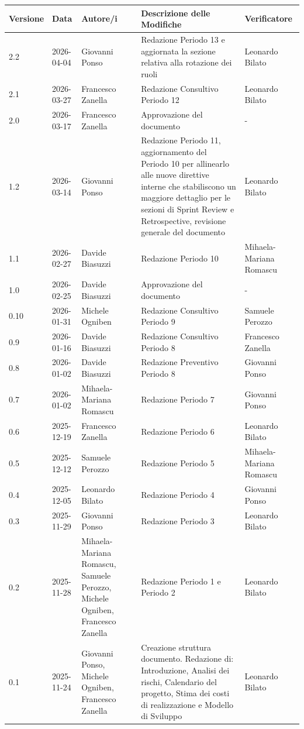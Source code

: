 \documentclass[a4paper, 11pt, oneside]{scrartcl} %
\begin{document}
\begin{center}
\renewcommand{\arraystretch}{1.2}
\begin{tabularx}{\textwidth}{@{}p{}p{}p{}X>{\centering\arraybackslash}p{}@{}}
\toprule
\textbf{Versione} & \textbf{Data} & \textbf{Autore/i} & \textbf{Descrizione delle Modifiche} & \textbf{Verificatore} \\
\midrule
2.2 & 2026-04-04 & Giovanni Ponso & Redazione Periodo 13 e aggiornata la sezione relativa alla rotazione dei ruoli & Leonardo Bilato \\
2.1 & 2026-03-27 & Francesco Zanella & Redazione Consultivo Periodo 12 & Leonardo Bilato \\
2.0 & 2026-03-17 & Francesco Zanella & Approvazione del documento & - \\
1.2 & 2026-03-14 & Giovanni Ponso & Redazione Periodo 11, aggiornamento del Periodo 10 per allinearlo alle nuove direttive interne che stabiliscono un maggiore dettaglio per le sezioni di Sprint Review e Retrospective, revisione generale del documento & Leonardo Bilato \\
1.1 & 2026-02-27 & Davide Biasuzzi & Redazione Periodo 10 & Mihaela-Mariana Romascu \\
1.0 & 2026-02-25 & Davide Biasuzzi & Approvazione del documento & - \\
0.10 & 2026-01-31 & Michele Ogniben & Redazione Consultivo Periodo 9 & Samuele Perozzo \\
0.9 & 2026-01-16 & Davide Biasuzzi & Redazione Consultivo Periodo 8 & Francesco Zanella \\
0.8 & 2026-01-02 & Davide Biasuzzi & Redazione Preventivo Periodo 8 & Giovanni Ponso \\
0.7 & 2026-01-02 & Mihaela-Mariana Romascu & Redazione Periodo 7 & Giovanni Ponso \\
0.6 & 2025-12-19 & Francesco Zanella & Redazione Periodo 6 & Leonardo Bilato \\
0.5 & 2025-12-12 & Samuele Perozzo & Redazione Periodo 5 & Mihaela-Mariana Romascu \\
0.4 & 2025-12-05 & Leonardo Bilato & Redazione Periodo 4 & Giovanni Ponso \\
0.3 & 2025-11-29 & Giovanni Ponso & Redazione Periodo 3 & Leonardo Bilato \\
0.2 & 2025-11-28 & Mihaela-Mariana Romascu, Samuele Perozzo, Michele Ogniben, Francesco Zanella & Redazione Periodo 1 e Periodo 2 & Leonardo Bilato \\
0.1 & 2025-11-24 & Giovanni Ponso, Michele Ogniben, Francesco Zanella & Creazione struttura documento. Redazione di: Introduzione, Analisi dei rischi, Calendario del progetto, Stima dei costi di realizzazione e Modello di Sviluppo & Leonardo Bilato \\
\bottomrule
\end{tabularx}
\end{center}
\end{document}
